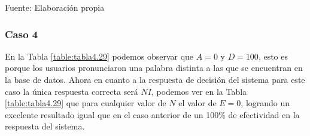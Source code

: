 \begin{center}
\begin{table}[H]
\centering
\caption{\small{Resultados para el caso 3 con U1 estático.}}
\label{table:tabla4.28}
\vskip 0.2cm
\begin{center}
\vskip 0.2cm
{\small{Fuente: Elaboración propia}}
\end{center}
\end{table}
\end{center}

\subsubsection{Caso 4}
En la Tabla \ref{table:tabla4.29} podemos observar que $A = 0$ y $D = 100$, esto es porque los usuarios pronunciaron una palabra distinta a las que se encuentran en la base de datos.
\vskip 0.5cm
Ahora en cuanto a la respuesta de decisión del sistema para este caso la única respuesta correcta será $NI$, podemos ver en la Tabla \ref{table:tabla4.29} que para cualquier valor de $N$ el valor de $E = 0$, logrando un excelente resultado igual que en el caso anterior de un 100\% de efectividad en la respuesta del sistema.

